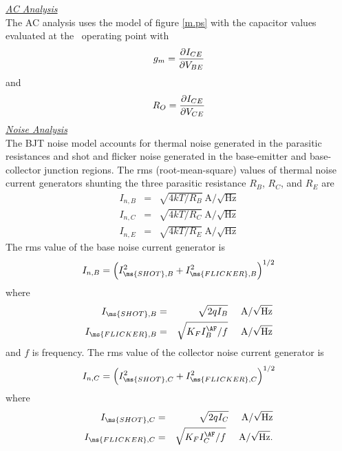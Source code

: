 \noindent\underline{\sl \large AC Analysis}\\[0.1in]
 The AC analysis uses the model of
figure  \ref{m.ps} with the capacitor values evaluated at the \dc\
operating point with
\begin{equation}
g_m = {{\textstyle\partial I_{CE}} \over {\textstyle\partial
V_{BE}}}
\end{equation}
and
\begin{equation}
R_{O} = {{\textstyle\partial I_{CE}} \over {\textstyle\partial
V_{CE}}}
\end{equation}
\vshift
\noindent\underline{\sl \large Noise Analysis}\\[0.1in]
  The BJT
noise model accounts for thermal noise generated in the parasitic
resistances and shot and flicker noise generated in the
base-emitter and base-collector junction regions. The rms
(root-mean-square) values of thermal noise current generators
shunting the three parasitic resistance $R_B$, $R_C$, and $R_E$
are
\begin{eqnarray}
I_{n,B} &=& \sqrt{4kT/R_B}~\mbox{A/}\sqrt{\mbox{Hz}}\\
I_{n,C} &=& \sqrt{4kT/R_C}~\mbox{A/}\sqrt{\mbox{Hz}}\\
I_{n,E} &=& \sqrt{4kT/R_E}~\mbox{A/}\sqrt{\mbox{Hz}}
\end{eqnarray}
The rms value of the base noise current generator is
\begin{equation}
I_{n,B} = \left( I_{\ms{SHOT},B}^2 + I_{\ms{FLICKER},B}^2
                \right)^{1/2}
\end{equation}
where
\begin{eqnarray}
I_{\ms{SHOT},B} &=& \sqrt{2qI_B} ~~~~\mbox{A/}\sqrt{\mbox{Hz}}\\
I_{\ms{FLICKER},B} &=& \sqrt{K_F I_{B}^{\AF} /f }
~~~~\mbox{A/}\sqrt{\mbox{Hz}}
\end{eqnarray}
and $f$ is frequency. The rms value of the collector noise current
generator is
\begin{equation}
I_{n,C} = \left( I_{\ms{SHOT},C}^2 + I_{\ms{FLICKER},C}^2
                \right)^{1/2}
\end{equation}
where
\begin{eqnarray}
I_{\ms{SHOT},C} &=& \sqrt{2qI_C} ~~~~\mbox{A/}\sqrt{\mbox{Hz}}\\
I_{\ms{FLICKER},C} &=& \sqrt{K_F I_C^{\AF} /f }
~~~~\mbox{A/}\sqrt{\mbox{Hz}}.
\end{eqnarray}
\newline
